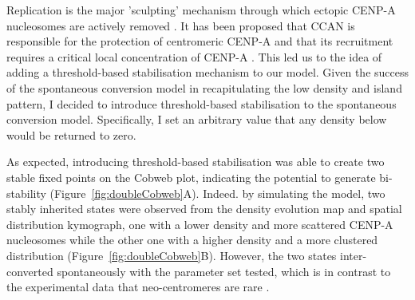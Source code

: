 Replication is the major 'sculpting' mechanism through which ectopic CENP-A nucleosomes are actively removed \citep{Nechemia-Arbely2019, Wang2021PhosphorylationCycle}. It has been proposed that CCAN is responsible for the protection of centromeric CENP-A and that its recruitment requires a critical local concentration of CENP-A \citep{Nechemia-Arbely2019, Bodor2014}. This led us to the idea of adding a threshold-based stabilisation mechanism to our model. Given the success of the spontaneous conversion model in recapitulating the low density and island pattern, I decided to introduce threshold-based stabilisation to the spontaneous conversion model. Specifically, I set an arbitrary value that any density below would be returned to zero. 

As expected, introducing threshold-based stabilisation was able to create two stable fixed points on the Cobweb plot, indicating the potential to generate bi-stability (Figure~\ref{fig:doubleCobweb}A). Indeed. by simulating the model, two stably inherited states were observed from the density evolution map and spatial distribution kymograph, one with a lower density and more scattered CENP-A nucleosomes while the other one with a higher density and a more clustered distribution (Figure~\ref{fig:doubleCobweb}B). However, the two states inter-converted spontaneously with the parameter set tested, which is in contrast to the experimental data that neo-centromeres are rare \citep{Marshall2008Neocentromeres:Evolution}. 

